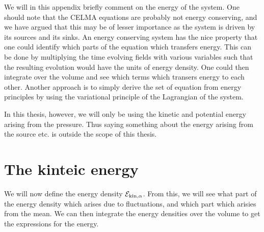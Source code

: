 We will in this appendix briefly comment on the energy of the system.
One should note that the CELMA equations are probably not energy conserving, and we have argued that this may be of lesser importance as the system is driven by its sources and its sinks.
An energy conserving system has the nice property that one could identify which parts of the equation which transfers energy.
This can be done by multiplying the time evolving fields with various variables such that the resulting evolution would have the units of energy density.
One could then integrate over the volume and see which terms which transers energy to each other.
Another approach is to simply derive the set of equation from energy principles by using the variational principle of the Lagrangian of the system.

In this thesis, however, we will only be using the kinetic and potential energy arising from the pressure.
Thus saying something about the energy arising from the source etc. is outside the scope of this thesis.

\section{The kinteic energy}
%
We will now define the energy density $\mathcal{E}_{\text{kin},\alpha}$.
From this, we will see what part of the energy density which arises due to fluctuations, and which part which arisies from the mean.
We can then integrate the energy densities over the volume to get the expressions for the energy.

